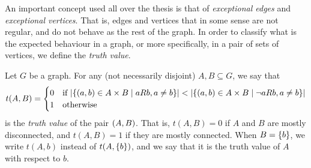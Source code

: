     An important concept used all over the thesis is that of \emph{exceptional edges} and \emph{exceptional vertices}.
    That is, edges and vertices that in some sense are not regular, and do not behave as the rest of the graph.
    In order to classify what is the expected behaviour in a graph, or more specifically, in a pair of sets of vertices,
    we define the \emph{truth value}.

    \begin{definition} \label{def:truth_value}
        Let $G$ be a graph.
        For any (not necessarily disjoint) $A, B \subseteq G$, we say that
        \[
            t(A,B) =
            \begin{cases}
                0 & \text{if } | \{ ( a, b ) \in A \times B \mid a R b, a \neq b \} | <
                    | \{ ( a, b ) \in A \times B \mid \neg a R b, a \neq b \} | \\
                1 & \text{otherwise}
            \end{cases}
        \]
        is the \emph{truth value} of the pair $( A,B )$.
        That is, $t(A,B) = 0$ if $A$ and $B$ are mostly disconnected, and $t(A,B) = 1$ if they are mostly connected.
        When $B = \{ b \}$, we write $t(A,b)$ instead of $t(A,\{ b \})$, and we say that it is the truth value of $A$
        with respect to $b$.
    \end{definition}

